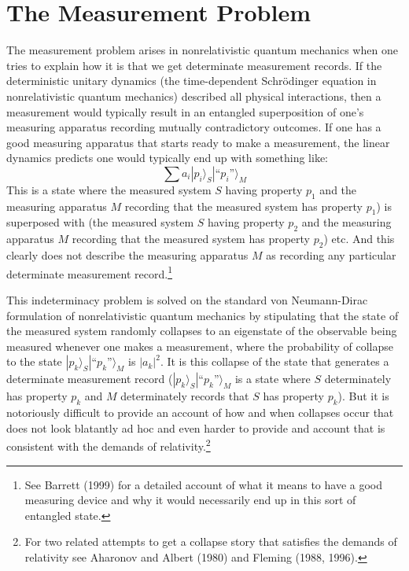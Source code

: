 \documentclass [12pt]{article}
\begin{document}
\section{The Measurement Problem}

The measurement problem arises in nonrelativistic quantum mechanics when
one tries to explain how it is that we get determinate measurement records.
If the deterministic unitary dynamics (the time-dependent Schr\"odinger
equation in nonrelativistic quantum mechanics) described all physical
interactions, then a measurement would typically result in an entangled
superposition of one's measuring apparatus recording mutually contradictory
outcomes.  If one has a good measuring apparatus that starts ready to
make a measurement, the linear dynamics predicts one would typically
end up with something like:
\begin{equation}
\sum a_i |p_i \rangle_S |\mbox{``$p_i$''} \rangle_M
\end{equation}
This is a state where the measured system $S$ having property $p_1$ and
the measuring apparatus $M$ recording that the measured
system has property $p_1$) is superposed with (the measured
system $S$ having property $p_2$ and the measuring apparatus $M$
recording that the measured system has property $p_2$) etc.  And
this clearly does not describe the measuring apparatus $M$ as
recording any particular determinate measurement record.\footnote{See Barrett (1999)
for a detailed account of what it means to have a good measuring device
and why it would necessarily end up in this sort of entangled state.} 

This indeterminacy problem is solved on the standard von Neumann-Dirac
formulation of nonrelativistic quantum mechanics by stipulating that the
state of the measured system randomly collapses to an eigenstate of the observable
being measured whenever one makes a measurement, where the probability
of collapse to the state $|p_k  \rangle_S |\mbox{``$p_k$''}  \rangle_M$ is
$|a_k|^2$.  It is this collapse of the state that generates a determinate
measurement record ($|p_k  \rangle_S |\mbox{``$p_k$''}  \rangle_M$ is a state
where $S$ determinately has property $p_k$ and $M$ determinately records
that $S$ has property $p_k$).  But it is notoriously difficult to provide
an account of how and when collapses occur that does not look blatantly
ad hoc and even harder to provide and account that is consistent with the
demands of relativity.\footnote{For two related attempts to get
a collapse story that satisfies the demands of relativity see Aharonov and
Albert (1980) and Fleming (1988, 1996).}
\end{document}
